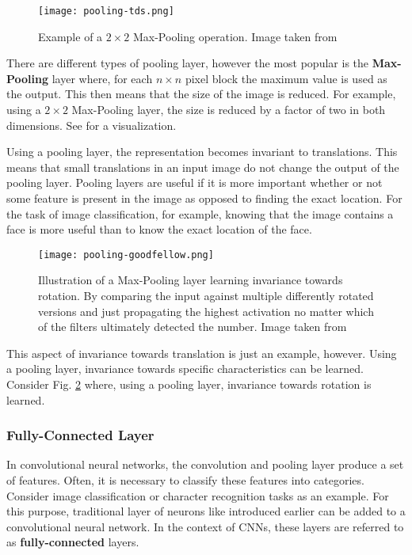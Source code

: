 \begin{figure}[htb!]
    \centering
    \texttt{[image: pooling-tds.png]}
    \caption{Example of a $2 \times 2$ Max-Pooling operation. Image taken from \cite{cornelisse_intuitive_2018}}
    \label{fig:pooling-tds}
\end{figure}

There are different types of pooling layer, however the most popular is the \textbf{Max-Pooling} layer where, for each $n \times n$ pixel block the maximum value is used as the output.
This then means that the size of the image is reduced.
For example, using a $2 \times 2$ Max-Pooling layer, the size is reduced by a factor of two in both dimensions.
See  for a visualization.

Using a pooling layer, the representation becomes invariant to translations.
This means that small translations in an input image do not change the output of the pooling layer.
Pooling layers are useful if it is more important whether or not some feature is present in the image as opposed to finding the exact location.
For the task of image classification, for example, knowing that the image contains a face is more useful than to know the exact location of the face.

\begin{figure}[htb!]
    \centering
    \texttt{[image: pooling-goodfellow.png]}
    \caption{Illustration of a Max-Pooling layer learning invariance towards rotation. By comparing the input against multiple differently rotated versions and just propagating the highest activation no matter which of the filters ultimately detected the number. Image taken from \cite{goodfellow_deep_2016}}
    \label{fig:pooling-goodfellow}
\end{figure}

This aspect of invariance towards translation is just an example, however.
Using a pooling layer, invariance towards specific characteristics can be learned.
Consider Fig. \ref{fig:pooling-goodfellow} where, using a pooling layer, invariance towards rotation is learned.

\subsubsection{Fully-Connected Layer}
In convolutional neural networks, the convolution and pooling layer produce a set of features.
Often, it is necessary to classify these features into categories.
Consider image classification or character recognition tasks as an example.
For this purpose, traditional layer of neurons like introduced earlier can be added to a convolutional neural network.
In the context of CNNs, these layers are referred to as \textbf{fully-connected} layers.
